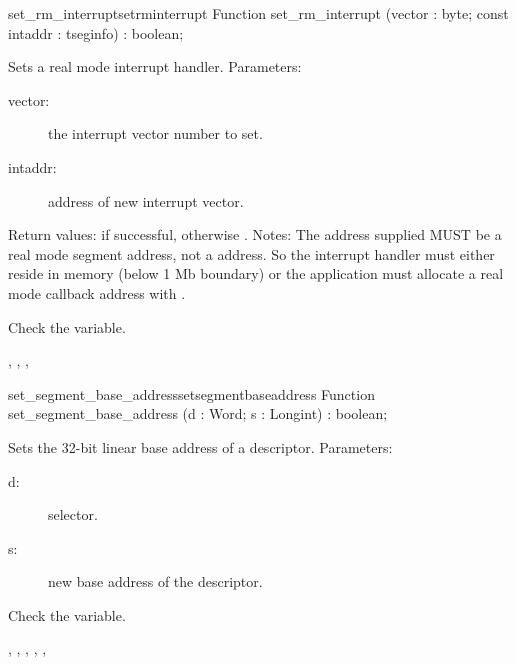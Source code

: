 \begin{functionl}{set\_rm\_interrupt}{setrminterrupt}
\Declaration
Function set\_rm\_interrupt (vector : byte; const intaddr :
tseginfo) : boolean;

\Description
Sets a real mode interrupt handler.
Parameters:
\begin{description}
\item[vector:\ ] the interrupt vector number to set.
\item[intaddr:\ ] address of new interrupt vector.
\end{description}
Return values:  if successful, otherwise .
Notes: The address supplied MUST be a real mode segment address, not a
 address. So the interrupt handler must either reside in \dos
memory (below 1 Mb boundary) or the application must allocate a real mode
callback address with .

\Errors
 Check the  variable.
\SeeAlso
 
, 
, , 
\end{functionl}
\begin{functionl}{set\_segment\_base\_address}{setsegmentbaseaddress}
\Declaration
Function set\_segment\_base\_address (d : Word; s : Longint) : boolean;

\Description
Sets the 32-bit linear base address of a descriptor.
Parameters: 
\begin{description}
\item[d:\ ] selector.
\item[s:\ ] new base address of the descriptor.
\end{description}

\Errors
 Check the  variable.
\SeeAlso

,
, 
, 
,
,

\end{functionl}
